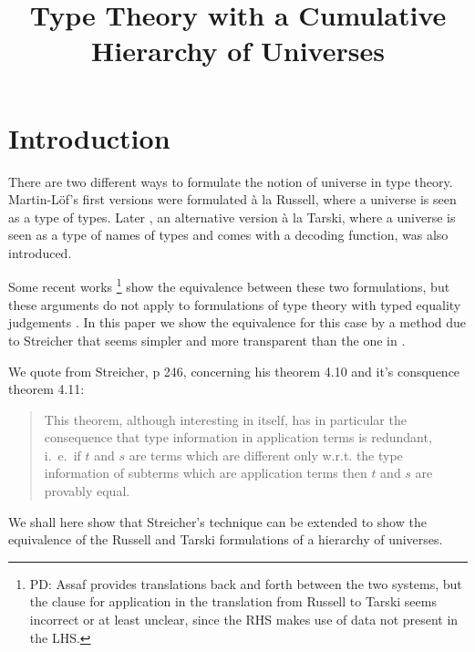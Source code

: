 \documentclass[11pt,a4paper]{article}
\theoremstyle{definition}
\begin{document}
\title{Type Theory with a Cumulative Hierarchy of Universes}

\author{}
\date{}
\maketitle


\section{Introduction}\label{sec:intros}

 There are two different ways to formulate the notion of universe in type theory. Martin-Löf's first versions \cite{martinlof:72,martinlof:predicative,martinlof:hannover,martinlof:padova} were formulated \`a la Russell, where a universe is seen as a type of types. Later \cite{martinlof:padova}, an alternative version \`a la Tarski, where a universe is seen as a type of names of types and comes with a decoding function, was also introduced.
 
Some recent works \cite{Assaf14,Thire20}\footnote{PD: Assaf provides translations back and forth between the two systems, but the clause for application in the translation from Russell to Tarski seems incorrect or at least unclear, since the RHS makes use of data not present in the LHS.} show the equivalence between these two formulations, but these arguments do not apply to formulations of type theory with typed equality judgements \cite{martinlof:hannover,martinlof:padova}. In this paper we show the equivalence for this case by a method due to Streicher  \cite{Streicher:semtt} that seems simpler
and more transparent than the one in \cite{Assaf14,Thire20}.

We quote from Streicher, p 246, concerning his theorem 4.10 and it's consquence theorem 4.11:
\begin{quotation}
This theorem, although interesting in itself, has in particular the consequence that type information in application terms is redundant, i.~e.~if $t$ and $s$ are terms which are different only w.r.t. the type information of subterms which are application terms then $t$ and $s$ are provably equal.
\end{quotation}
We shall here show that Streicher's technique can be extended to show the equivalence of the Russell and Tarski formulations of a hierarchy of universes.
\end{document}
